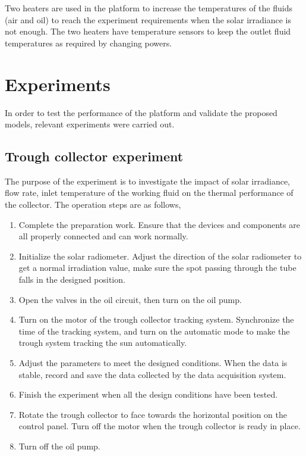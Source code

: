 Two heaters are used in the platform to increase the temperatures of the fluids (air and oil) to reach the experiment requirements when the solar irradiance is not enough. The two heaters have temperature sensors to keep the 
outlet fluid temperatures as required by changing powers.
 


\section{Experiments}

In order to test the performance of the platform and validate the proposed models, relevant experiments were carried out.
\subsection{Trough collector experiment}
The purpose of the experiment is to investigate the impact of solar irradiance, flow rate, inlet temperature of the working fluid on the thermal performance of the collector. The operation steps are as follows,
\begin{enumerate}[label=(\arabic*)]
	\item Complete the preparation work. Ensure that the devices and components are all properly connected and can work normally.
	\item Initialize the solar radiometer. Adjust the direction of the solar radiometer to get a normal irradiation value, make sure the spot passing through the tube falls in the designed position.
	\item Open the valves in the oil circuit, then turn on the oil pump.
	\item Turn on the motor of the trough collector tracking system. Synchronize the time of the tracking system, and turn on the automatic mode to make the trough system tracking the sun automatically.
	\item Adjust the parameters to meet the designed conditions. When the data is stable, record and save the data collected by the data acquisition system.
	\item Finish the experiment when all the design conditions have been tested.
	\item Rotate the trough collector to face towards the horizontal position on the control panel. Turn off the motor when the trough collector is ready in place.
	\item Turn off the oil pump.
\end{enumerate}
